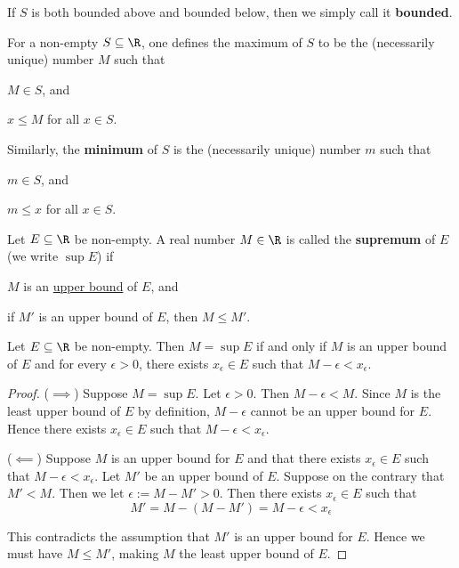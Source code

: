 If $S$ is both bounded above and bounded below, then we simply call it
\textbf{bounded}.

\label{c3ec51c}

For a non-empty $S\subseteq\R$, one defines the maximum of $S$ to be the
(necessarily unique) number $M$ such that
\begin{enumerati}
  \item $M\in S$, and
  \item $x\leq M$ for all $x\in S$.
\end{enumerati}

Similarly, the \textbf{minimum} of $S$ is the (necessarily unique) number $m$
such that
\begin{enumerati}
  \item $m\in S$, and
  \item $m\leq x$ for all $x\in S$.
\end{enumerati}

\label{e6981e1}

Let $E\subseteq\R$ be non-empty. A real number $M\in\R$ is called the
\textbf{supremum} of $E$ (we write $\sup E$) if
\begin{enumerati}
  \item $M$ is an \href{e4698be}{upper bound} of $E$, and
  \item if $M'$ is an upper bound of $E$, then $M\leq M'$.
\end{enumerati}

\label{f77f162}

Let $E\subseteq\R$ be non-empty. Then $M=\sup E$ if and only if $M$ is an upper
bound of $E$ and for every $\epsilon>0$, there exists $x_\epsilon\in E$ such
that $M-\epsilon<x_\epsilon$.

\begin{proof}
  ($\implies$) Suppose $M=\sup E$. Let $\epsilon>0$. Then $M-\epsilon<M$. Since
  $M$ is the least upper bound of $E$ by definition, $M-\epsilon$ cannot be an
  upper bound for $E$. Hence there exists $x_\epsilon\in E$ such that
  $M-\epsilon<x_\epsilon$.

  ($\impliedby$) Suppose $M$ is an upper bound for $E$ and that there exists
  $x_\epsilon\in E$ such that $M-\epsilon<x_\epsilon$. Let $M'$ be an upper
  bound of $E$. Suppose on the contrary that $M'<M$. Then we let
  $\epsilon:=M-M'>0$. Then there exists $x_\epsilon\in E$ such that
  $$
    M'=M-(M-M')=M-\epsilon<x_\epsilon
  $$

  This contradicts the assumption that $M'$ is an upper bound for $E$. Hence we
  must have $M\leq M'$, making $M$ the least upper bound of $E$.
\end{proof}

